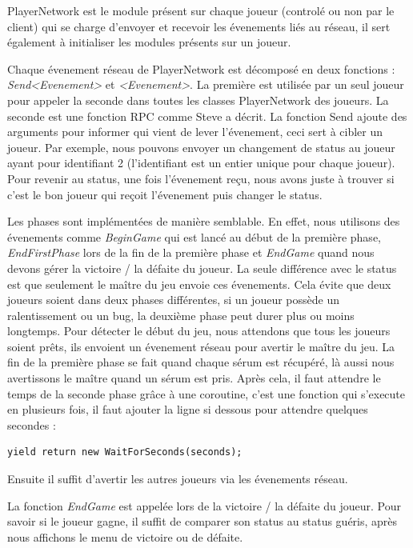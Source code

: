 \documentclass{article}
\begin{document}
PlayerNetwork est le module présent sur chaque joueur (controlé ou non par le client) qui se charge d'envoyer et recevoir les évenements liés au réseau, il sert également à initialiser les modules présents sur un joueur.

Chaque évenement réseau de PlayerNetwork est décomposé en deux fonctions : \emph{Send<Evenement>} et \emph{<Evenement>}. La première est utilisée par un seul joueur pour appeler la seconde dans toutes les classes PlayerNetwork des joueurs. La seconde est une fonction RPC comme Steve a décrit. La fonction Send ajoute des arguments pour informer qui vient de lever l'évenement, ceci sert à cibler un joueur. Par exemple, nous pouvons envoyer un changement de status au joueur ayant pour identifiant 2 (l'identifiant est un entier unique pour chaque joueur). Pour revenir au status, une fois l'évenement reçu, nous avons juste à trouver si c'est le bon joueur qui reçoit l'évenement puis changer le status.

Les phases sont implémentées de manière semblable. En effet, nous utilisons des évenements comme \emph{BeginGame} qui est lancé au début de la première phase, \emph{EndFirstPhase} lors de la fin de la première phase et \emph{EndGame} quand nous devons gérer la victoire / la défaite du joueur. La seule différence avec le status est que seulement le maître du jeu envoie ces évenements. Cela évite que deux joueurs soient dans deux phases différentes, si un joueur possède un ralentissement ou un bug, la deuxième phase peut durer plus ou moins longtemps. Pour détecter le début du jeu, nous attendons que tous les joueurs soient prêts, ils envoient un évenement réseau pour avertir le maître du jeu. La fin de la première phase se fait quand chaque sérum est récupéré, là aussi nous avertissons le maître quand un sérum est pris. Après cela, il faut attendre le temps de la seconde phase grâce à une coroutine, c'est une fonction qui s'execute en plusieurs fois, il faut ajouter la ligne si dessous pour attendre quelques secondes :

\begin{lstlisting}
yield return new WaitForSeconds(seconds);
\end{lstlisting}

Ensuite il suffit d'avertir les autres joueurs via les évenements réseau.

La fonction \emph{EndGame} est appelée lors de la victoire / la défaite du joueur. Pour savoir si le joueur gagne, il suffit de comparer son status au status guéris, après nous affichons le menu de victoire ou de défaite.
\end{document}

